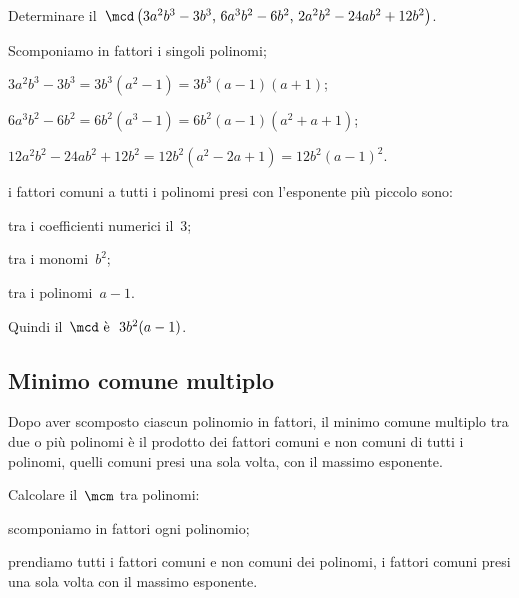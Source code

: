\begin{exrig}
 \begin{esempio}
Determinare il~$\mcd\left(3a^{2}b^{3}-3b^{3}\text{,~}6a^{3}b^{2}-6b^{2}\text{,~}2a^{2}b^{2}-24ab^{2}+12b^{2}\right)$.
 \begin{enumeratea}
 \item Scomponiamo in fattori i singoli polinomi;
  \begin{description*}
  \item $3a^{2}b^{3}-3b^{3}=3b^{3}\left(a^{2}-1\right)=3b^{3}(a-1)(a+1)$;
  \item $6a^{3}b^{2}-6b^{2}=6b^{2}\left(a^{3}-1\right)=6b^{2}(a-1)\left(a^{2}+a+1\right)$;
  \item $12a^{2}b^{2}-24ab^{2}+12b^{2}=12b^{2}\left(a^{2}-2a+1\right)=12b^{2}(a-1)^{2}$.
  \end{description*}
 \item i fattori comuni a tutti i polinomi presi con l'esponente più piccolo sono:
  \begin{description*}
  \item tra i coefficienti numerici il~$3$;
  \item tra i monomi~$b^{2}$;
  \item tra i polinomi~$a-1$.
  \end{description*}
 \end{enumeratea}
 Quindi il~$\mcd\text{ è }~3b^{2}(a-1)$.
 \end{esempio}
\end{exrig}

\subsection{Minimo comune multiplo}
Dopo aver scomposto ciascun polinomio in fattori, il minimo comune multiplo tra due o più polinomi è il prodotto dei fattori comuni
e non comuni di tutti i polinomi, quelli comuni presi una sola volta, con il massimo esponente.

\begin{procedura}
Calcolare il~$\mcm$ tra polinomi:
\begin{enumeratea}
\item scomponiamo in fattori ogni polinomio;
\item prendiamo tutti i fattori comuni e non comuni dei polinomi, i fattori comuni presi una sola
   volta con il massimo esponente.
\end{enumeratea}
\end{procedura}

